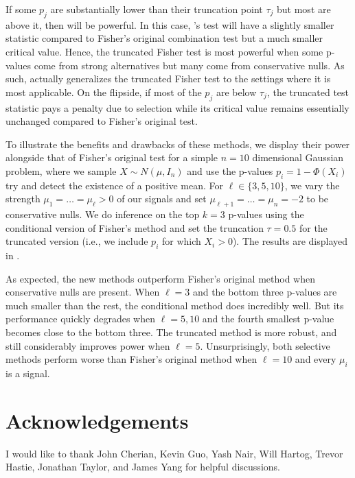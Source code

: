 \documentclass{article}
\begin{document}
If some $p_j$ are substantially lower than their truncation point $\tau_j$ but most are above it, then  will be powerful. In this case, 's test will have a slightly smaller statistic compared to Fisher's original combination test but a much smaller critical value. Hence, the truncated Fisher test is most powerful when some p-values come from strong alternatives but many come from conservative nulls. As such,  actually generalizes the truncated Fisher test to the settings where it is most applicable. On the flipside, if most of the $p_j$ are below $\tau_j$, the truncated test statistic pays a penalty due to selection while its critical value remains essentially unchanged compared to Fisher's original test. 

To illustrate the benefits and drawbacks of these methods, we display their power alongside that of Fisher's original test for a simple $n=10$ dimensional Gaussian problem, where we sample $X \sim N(\mu, I_n)$ and use the p-values $p_i = 1 - \Phi(X_i)$ try and detect the existence of a positive mean. For $\ell \in \{3, 5, 10\}$, we vary the strength $\mu_1 = \dots = \mu_{\ell} > 0$ of our signals and set $\mu_{\ell + 1} = \dots = \mu_n = -2$ to be conservative nulls. We do inference on the top $k=3$ p-values using the conditional version of Fisher's method and set the truncation $\tau = 0.5$ for the truncated version (i.e., we include $p_i$ for which $X_i > 0$). The results are displayed in .

As expected, the new methods outperform Fisher's original method when conservative nulls are present. When $\ell=3$ and the bottom three p-values are much smaller than the rest, the conditional method does incredibly well. But its performance quickly degrades when $\ell = 5, 10$ and the fourth smallest p-value becomes close to the bottom three. The truncated method is more robust, and still considerably improves power when $\ell=5$. Unsurprisingly, both selective methods perform worse than Fisher's original method when $\ell=10$ and every $\mu_i$ is a signal. 


\section*{Acknowledgements}
I would like to thank John Cherian, Kevin Guo, Yash Nair, Will Hartog, Trevor Hastie, Jonathan Taylor, and James Yang for helpful discussions.



\end{document}
